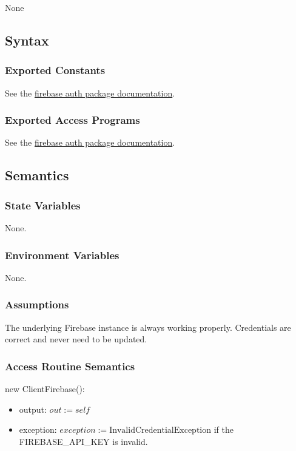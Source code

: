 \documentclass[12pt, titlepage]{article}
\begin{document}
None

\subsection{Syntax}

\subsubsection{Exported Constants}

See the \href{https://firebase.google.com/docs/reference/js/auth}{firebase auth package documentation}.

\subsubsection{Exported Access Programs}

See the \href{https://firebase.google.com/docs/reference/js/auth}{firebase auth package documentation}.

\subsection{Semantics}

\subsubsection{State Variables}

None.

\subsubsection{Environment Variables}

None.

\subsubsection{Assumptions}

The underlying Firebase instance is always working properly. Credentials are correct and never need to be updated.

\subsubsection{Access Routine Semantics}

\noindent new ClientFirebase():
\begin{itemize} 
\item output: $out := self$ 
\item exception: $exception := \text{InvalidCredentialException}$ if the FIREBASE\_API\_KEY is invalid.  
\end{itemize} 
\end{document}
